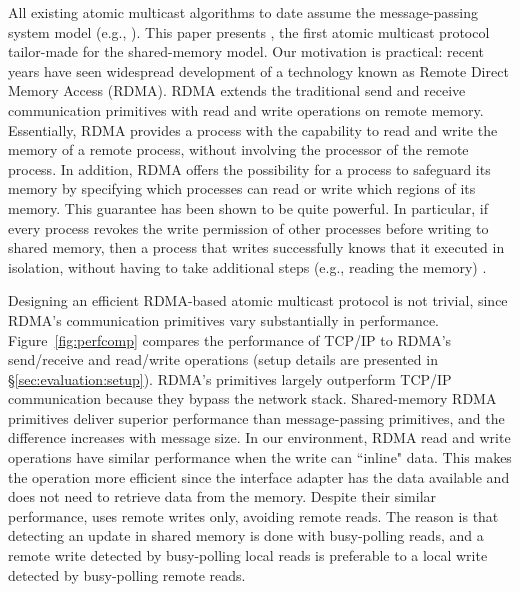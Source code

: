 All existing atomic multicast algorithms to date assume the message-passing system model (e.g., \cite{Coelho2017,gotsman2019white,birman1987reliable, delporte2000fault, bezerra2015ridge,
marandi2012multi}).
This paper presents \libname, the first atomic multicast protocol tailor-made for the shared-memory model.
Our motivation is practical: recent years have seen widespread development of a technology known as Remote Direct Memory Access (RDMA).
RDMA extends the traditional send and receive communication primitives with read and write operations on remote memory.
Essentially, RDMA provides a process with the capability to read and write the memory of a remote process, without involving the processor of the remote process.
In addition, RDMA offers the possibility for a process to safeguard its memory by specifying which processes can read or write which regions of its memory.
This guarantee has been shown to be quite powerful.
In particular, if every process revokes the write permission of other processes before writing to shared memory, then a process that writes successfully knows that it executed in isolation, without having to take additional steps (e.g., reading the memory) \cite{Aguilera2019}. 

Designing an efficient RDMA-based atomic multicast protocol is not trivial, since RDMA's communication primitives vary substantially in performance.
Figure~\ref{fig:perfcomp} compares the performance of TCP/IP to RDMA's send/receive and read/write operations (setup details are presented in \S\ref{sec:evaluation:setup}).
RDMA's primitives largely outperform TCP/IP communication because they bypass the network stack.
Shared-memory RDMA primitives deliver superior performance than message-passing primitives, and the difference increases with message size.
In our environment, RDMA read and write operations have similar performance when the write can ``inline" data.
This makes the operation more efficient since the interface adapter has the data available and does not need to retrieve data from the memory.
Despite their similar performance, \libname uses remote writes only, avoiding remote reads.
The reason is that detecting an update in shared memory is done with busy-polling reads, and a remote write detected by busy-polling local reads is preferable to a local write detected by busy-polling remote reads.

